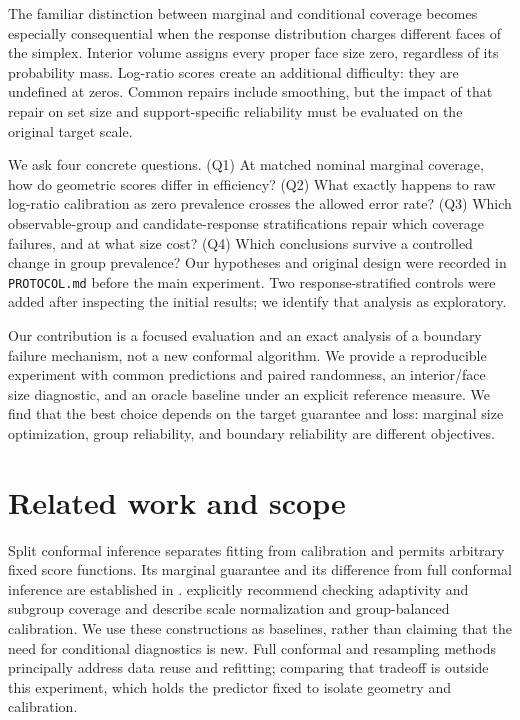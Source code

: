 \documentclass{article}
\begin{document}
The familiar distinction between marginal and conditional coverage becomes especially consequential when the response distribution charges different faces of the simplex. Interior volume assigns every proper face size zero, regardless of its probability mass. Log-ratio scores create an additional difficulty: they are undefined at zeros. Common repairs include smoothing, but the impact of that repair on set size and support-specific reliability must be evaluated on the original target scale.

We ask four concrete questions. (Q1) At matched nominal marginal coverage, how do geometric scores differ in efficiency? (Q2) What exactly happens to raw log-ratio calibration as zero prevalence crosses the allowed error rate? (Q3) Which observable-group and candidate-response stratifications repair which coverage failures, and at what size cost? (Q4) Which conclusions survive a controlled change in group prevalence? Our hypotheses and original design were recorded in \texttt{PROTOCOL.md} before the main experiment. Two response-stratified controls were added after inspecting the initial results; we identify that analysis as exploratory.

Our contribution is a focused evaluation and an exact analysis of a boundary failure mechanism, not a new conformal algorithm. We provide a reproducible experiment with common predictions and paired randomness, an interior/face size diagnostic, and an oracle baseline under an explicit reference measure. We find that the best choice depends on the target guarantee and loss: marginal size optimization, group reliability, and boundary reliability are different objectives.

\section{Related work and scope}
Split conformal inference separates fitting from calibration and permits arbitrary fixed score functions. Its marginal guarantee and its difference from full conformal inference are established in \citet{lei2016}. \citet{angelopoulos2021} explicitly recommend checking adaptivity and subgroup coverage and describe scale normalization and group-balanced calibration. We use these constructions as baselines, rather than claiming that the need for conditional diagnostics is new. Full conformal and resampling methods principally address data reuse and refitting; comparing that tradeoff is outside this experiment, which holds the predictor fixed to isolate geometry and calibration.
\end{document}
